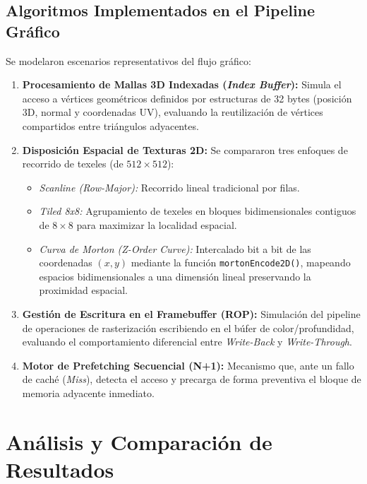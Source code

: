 \documentclass[12pt,letterpaper]{article}
\begin{document}
\subsection{\color{UCSky}Algoritmos Implementados en el Pipeline Gráfico}
Se modelaron escenarios representativos del flujo gráfico:
\begin{enumerate}
    \item \textbf{Procesamiento de Mallas 3D Indexadas (\textit{Index Buffer}):} Simula el acceso a vértices geométricos definidos por estructuras de 32 bytes (posición 3D, normal y coordenadas UV), evaluando la reutilización de vértices compartidos entre triángulos adyacentes.
    \item \textbf{Disposición Espacial de Texturas 2D:} Se compararon tres enfoques de recorrido de texeles (de $512 \times 512$):
    \begin{itemize}
        \item \textit{Scanline (Row-Major):} Recorrido lineal tradicional por filas.
        \item \textit{Tiled 8x8:} Agrupamiento de texeles en bloques bidimensionales contiguos de $8 \times 8$ para maximizar la localidad espacial.
        \item \textit{Curva de Morton (Z-Order Curve):} Intercalado bit a bit de las coordenadas $(x, y)$ mediante la función \texttt{mortonEncode2D()}, mapeando espacios bidimensionales a una dimensión lineal preservando la proximidad espacial.
    \end{itemize}
    \item \textbf{Gestión de Escritura en el Framebuffer (ROP):} Simulación del pipeline de operaciones de rasterización escribiendo en el búfer de color/profundidad, evaluando el comportamiento diferencial entre \textit{Write-Back} y \textit{Write-Through}.
    \item \textbf{Motor de Prefetching Secuencial (N+1):} Mecanismo que, ante un fallo de caché (\textit{Miss}), detecta el acceso y precarga de forma preventiva el bloque de memoria adyacente inmediato.
\end{enumerate}

\section{\color{UCBlue}Análisis y Comparación de Resultados}
\end{document}
